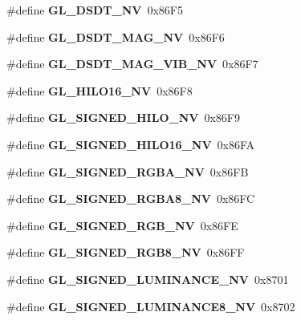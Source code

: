 \begin{DoxyCompactItemize}
\item 
\#define {\bfseries G\+L\+\_\+\+D\+S\+D\+T\+\_\+\+N\+V}~0x86\+F5\label{_s_d_l__opengl_8h_ad75abb33a3a52d6a3221174535d31dd7}

\item 
\#define {\bfseries G\+L\+\_\+\+D\+S\+D\+T\+\_\+\+M\+A\+G\+\_\+\+N\+V}~0x86\+F6\label{_s_d_l__opengl_8h_a72600080a260fc75df54c808aa4aa578}

\item 
\#define {\bfseries G\+L\+\_\+\+D\+S\+D\+T\+\_\+\+M\+A\+G\+\_\+\+V\+I\+B\+\_\+\+N\+V}~0x86\+F7\label{_s_d_l__opengl_8h_a42271728ce9b04670f3805b3f126ad2d}

\item 
\#define {\bfseries G\+L\+\_\+\+H\+I\+L\+O16\+\_\+\+N\+V}~0x86\+F8\label{_s_d_l__opengl_8h_a7554d7f9948c4cb2a2d0b5e73756cdba}

\item 
\#define {\bfseries G\+L\+\_\+\+S\+I\+G\+N\+E\+D\+\_\+\+H\+I\+L\+O\+\_\+\+N\+V}~0x86\+F9\label{_s_d_l__opengl_8h_a7e2a8c8236572ee1d140c3470c16c9b9}

\item 
\#define {\bfseries G\+L\+\_\+\+S\+I\+G\+N\+E\+D\+\_\+\+H\+I\+L\+O16\+\_\+\+N\+V}~0x86\+F\+A\label{_s_d_l__opengl_8h_a206b48daa4b469e4d6d381f39b3eb053}

\item 
\#define {\bfseries G\+L\+\_\+\+S\+I\+G\+N\+E\+D\+\_\+\+R\+G\+B\+A\+\_\+\+N\+V}~0x86\+F\+B\label{_s_d_l__opengl_8h_a7356cb10f918aa1be5d11d5e71dca2c5}

\item 
\#define {\bfseries G\+L\+\_\+\+S\+I\+G\+N\+E\+D\+\_\+\+R\+G\+B\+A8\+\_\+\+N\+V}~0x86\+F\+C\label{_s_d_l__opengl_8h_ae439cb05f690ea13e36db44552dd83fb}

\item 
\#define {\bfseries G\+L\+\_\+\+S\+I\+G\+N\+E\+D\+\_\+\+R\+G\+B\+\_\+\+N\+V}~0x86\+F\+E\label{_s_d_l__opengl_8h_a86d2d2f006735de0b3e56f8aa89ea69c}

\item 
\#define {\bfseries G\+L\+\_\+\+S\+I\+G\+N\+E\+D\+\_\+\+R\+G\+B8\+\_\+\+N\+V}~0x86\+F\+F\label{_s_d_l__opengl_8h_ad98caca23dca937b7617cb9f7b31a939}

\item 
\#define {\bfseries G\+L\+\_\+\+S\+I\+G\+N\+E\+D\+\_\+\+L\+U\+M\+I\+N\+A\+N\+C\+E\+\_\+\+N\+V}~0x8701\label{_s_d_l__opengl_8h_a1adef2891d1f90dcafdb634d288f7049}

\item 
\#define {\bfseries G\+L\+\_\+\+S\+I\+G\+N\+E\+D\+\_\+\+L\+U\+M\+I\+N\+A\+N\+C\+E8\+\_\+\+N\+V}~0x8702\label{_s_d_l__opengl_8h_a8e27100cd5557260b8779cece3284881}


\end{DoxyCompactItemize}

